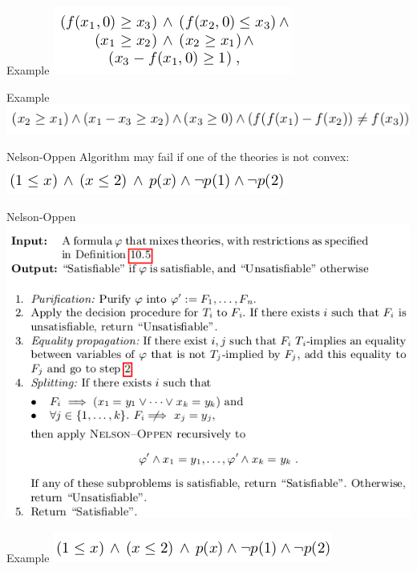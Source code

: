 \documentclass{beamer}
\begin{document}
\begin{frame}{Example}
\includegraphics[scale=0.5]{ex2.png}\newline
\end{frame}

\begin{frame}{Example}
\includegraphics[scale=0.5]{ex3.png}\newline
\end{frame}

\begin{frame}{Nelson-Oppen}
Algorithm may fail if one of the theories is not convex:
\includegraphics[scale=0.5]{ex4.png}\newline
\end{frame}

\begin{frame}{Nelson-Oppen}
\includegraphics[scale=0.5]{Nelson-Oppen.png}\newline
\end{frame}

\begin{frame}{Example}
\includegraphics[scale=0.5]{ex4.png}\newline
\end{frame}
\end{document}
